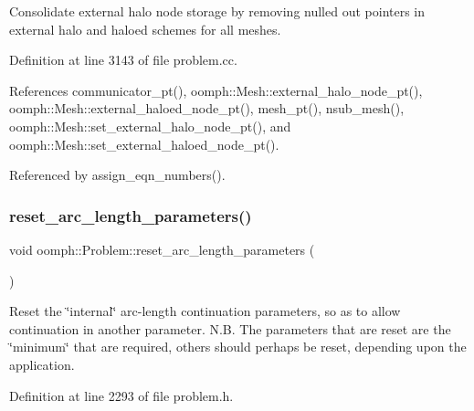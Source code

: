 Consolidate external halo node storage by removing nulled out pointers in external halo and haloed schemes for all meshes. 

Definition at line 3143 of file problem.\+cc.



References communicator\+\_\+pt(), oomph\+::\+Mesh\+::external\+\_\+halo\+\_\+node\+\_\+pt(), oomph\+::\+Mesh\+::external\+\_\+haloed\+\_\+node\+\_\+pt(), mesh\+\_\+pt(), nsub\+\_\+mesh(), oomph\+::\+Mesh\+::set\+\_\+external\+\_\+halo\+\_\+node\+\_\+pt(), and oomph\+::\+Mesh\+::set\+\_\+external\+\_\+haloed\+\_\+node\+\_\+pt().



Referenced by assign\+\_\+eqn\+\_\+numbers().

\mbox{\label{classoomph_1_1Problem_a6477df6e8184dc78e9d9ff82c7627cef}} 
\subsubsection{\texorpdfstring{reset\+\_\+arc\+\_\+length\+\_\+parameters()}{reset\_arc\_length\_parameters()}}
{\footnotesize\ttfamily void oomph\+::\+Problem\+::reset\+\_\+arc\+\_\+length\+\_\+parameters (\begin{DoxyParamCaption}{ }\end{DoxyParamCaption})\hspace{0.3cm}{\ttfamily [inline]}}



Reset the \char`\"{}internal\char`\"{} arc-\/length continuation parameters, so as to allow continuation in another parameter. N.\+B. The parameters that are reset are the \char`\"{}minimum\char`\"{} that are required, others should perhaps be reset, depending upon the application. 



Definition at line 2293 of file problem.\+h.

\mbox{\label{classoomph_1_1Problem_aecb590c73e64b0a85f7bec0053e2c51d}} 
